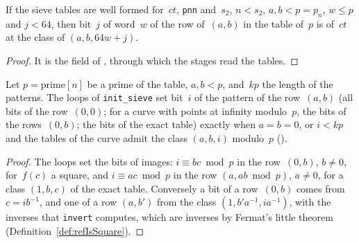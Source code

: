 
\begin{lemma}\label{lem:SieveTables.WF.getLsbD_eq_admits12}
  \leanok
  If the sieve tables are well formed for~$ct$, \texttt{pnn} and~$s_2$, $n < s_2$,
  $a, b < p = p_n$, $w \le p$ and $j < 64$, then bit~$j$ of word~$w$ of the row of~$(a, b)$ in the
  table of~$p$ is  of~$ct$ at the class of $(a, b, 64 w + j)$.
\end{lemma}

\begin{proof}
  \leanok
  It is the field of , through which the stages read the tables.
\end{proof}

\begin{lemma}\label{lem:patternBits_iff}
  \leanok
  Let $p = \mathrm{prime}[n]$ be a prime of the table, $a, b < p$, and~$k p$ the length of the
  patterns. The loops of \texttt{init\_sieve} set bit~$i$ of the pattern of the row~$(a, b)$ (all
  bits of the row~$(0, 0)$; for a curve with points at infinity modulo~$p$, the bits
   of the rows~$(0, b)$; the bits  of the
  exact table) exactly when $a = b = 0$, or $i < k p$ and the tables of the curve admit the class
  $(a, b, i)$ modulo~$p$ ().
\end{lemma}

\begin{proof}
  \leanok
  The loops set the bits of images: $i \equiv b c \bmod p$ in the row~$(0, b)$, $b \ne 0$,
  for~$f(c)$ a square, and $i \equiv a c \bmod p$ in the row $(a, a b \bmod p)$, $a \ne 0$, for a class
  $(1, b, c)$ of the exact table. Conversely a bit of a row~$(0, b)$ comes from $c = i b^{-1}$, and
  one of a row $(a, b')$ from the class $(1, b' a^{-1}, i a^{-1})$, with the inverses that
  \texttt{invert} computes, which are inverses by Fermat's little theorem
  (Definition~\ref{def:refIsSquare}).
\end{proof}

